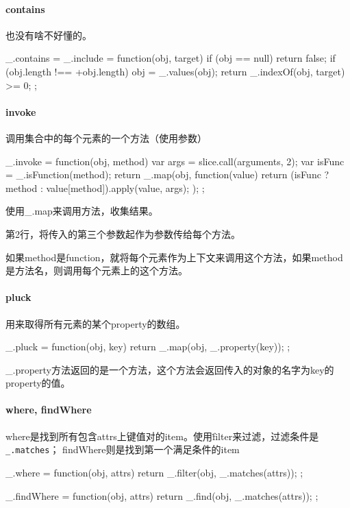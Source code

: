 \paragraph{contains} 也没有啥不好懂的。
 
\begin{JavaScript}
  _.contains = _.include = function(obj, target) {
    if (obj == null) return false;
    if (obj.length !== +obj.length) obj = _.values(obj);
    return _.indexOf(obj, target) >= 0;
  };
\end{JavaScript}

\paragraph{invoke} 调用集合中的每个元素的一个方法（使用参数）

\begin{JavaScript}
  _.invoke = function(obj, method) {
    var args = slice.call(arguments, 2);
    var isFunc = _.isFunction(method);
    return _.map(obj, function(value) {
      return (isFunc ? method : value[method]).apply(value, args);
    });
  };
\end{JavaScript}

使用\_.map来调用方法，收集结果。

第2行，将传入的第三个参数起作为参数传给每个方法。

如果method是function，就将每个元素作为上下文来调用这个方法，如果method是方法名，则调用每个元素上的这个方法。

\paragraph{pluck} 用来取得所有元素的某个property的数组。

\begin{JavaScript}
  _.pluck = function(obj, key) {
    return _.map(obj, _.property(key));
  };
\end{JavaScript}

\_.property方法返回的是一个方法，这个方法会返回传入的对象的名字为key的property的值。


\paragraph{where, findWhere} where是找到所有包含attrs上键值对的item。使用\.filter来过滤，过滤条件是\lstinline!_.matches!； findWhere则是找到第一个满足条件的item

\begin{JavaScript}
  _.where = function(obj, attrs) {
    return _.filter(obj, _.matches(attrs));
  };
  
  _.findWhere = function(obj, attrs) {
    return _.find(obj, _.matches(attrs));
  };
\end{JavaScript}

